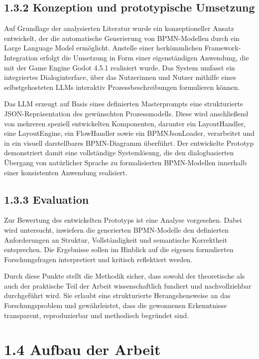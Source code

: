 \documentclass[a4paper,12pt]{scrreprt}
\begin{document}
\newpage

\subsection*{1.3.2 Konzeption und prototypische Umsetzung}
Auf Grundlage der analysierten Literatur wurde ein konzeptioneller Ansatz entwickelt, der die automatische Generierung von BPMN-Modellen durch ein Large Language Model ermöglicht. Anstelle einer herkömmlichen Framework-Integration erfolgt die Umsetzung in Form einer eigenständigen Anwendung, die mit der Game Engine Godot 4.5.1 realisiert wurde. Das System umfasst ein integriertes Dialoginterface, über das Nutzerinnen und Nutzer mithilfe eines selbstgehosteten LLMs interaktiv Prozessbeschreibungen formulieren können.

Das LLM erzeugt auf Basis eines definierten Masterprompts eine strukturierte JSON-Repräsentation des gewünschten Prozessmodells. Diese wird anschließend von mehreren speziell entwickelten Komponenten, darunter ein LayoutHandler, eine LayoutEngine, ein FlowHandler sowie ein BPMNJsonLoader, verarbeitet und in ein visuell darstellbares BPMN-Diagramm überführt. Der entwickelte Prototyp demonstriert damit eine vollständige Systemlösung, die den dialogbasierten Übergang von natürlicher Sprache zu formalisierten BPMN-Modellen innerhalb einer konsistenten Anwendung realisiert.

\subsection*{1.3.3 Evaluation}
Zur Bewertung des entwickelten Prototyps ist eine Analyse vorgesehen. Dabei wird untersucht, inwiefern die generierten BPMN-Modelle den definierten Anforderungen an Struktur, Vollständigkeit und semantische Korrektheit entsprechen. Die Ergebnisse sollen im Hinblick auf die eigenen formulierten Forschungsfragen interpretiert und kritisch reflektiert werden.

Durch diese Punkte stellt die Methodik sicher, dass sowohl der theoretische als auch der praktische Teil der Arbeit wissenschaftlich fundiert und nachvollziehbar durchgeführt wird. Sie erlaubt eine strukturierte Herangehensweise an das Forschungsproblem und gewährleistet, dass die gewonnenen Erkenntnisse transparent, reproduzierbar und methodisch begründet sind.

\section*{1.4 Aufbau der Arbeit}
\end{document}
